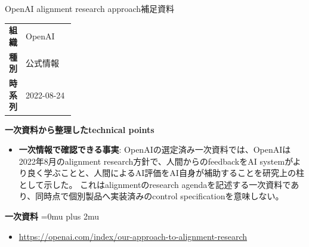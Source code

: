 \begin{technicalnote}{OpenAI alignment research approach}{補足資料}
\begingroup
\begin{tabularx}{\linewidth}{@{}>{\bfseries}p{0.22\linewidth}X@{}}
組織 & OpenAI \\
種別 & 公式情報 \\
時系列 & 2022-08-24 \\
\end{tabularx}
\smallskip
{\bfseries 一次資料から整理したtechnical points}
\begin{itemize}[leftmargin=1.5em,itemsep=0.35em]
\item \textbf{一次情報で確認できる事実}: OpenAIの選定済み一次資料では、OpenAIは2022年8月のalignment research方針で、人間からのfeedbackをAI systemがより良く学ぶことと、人間によるAI評価をAI自身が補助することを研究上の柱として示した。 これはalignmentのresearch agendaを記述する一次資料であり、同時点で個別製品へ実装済みのcontrol specificationを意味しない。
\end{itemize}
\begin{minipage}{\linewidth}
\begin{samepage}
{\bfseries 一次資料}
\begingroup\sloppy
\Urlmuskip=0mu plus 2mu\relax
\begin{itemize}[leftmargin=1.5em,itemsep=0.25em]
\item {\scriptsize\url{https://openai.com/index/our-approach-to-alignment-research}}
\end{itemize}
\endgroup
\end{samepage}
\end{minipage}
\endgroup
\end{technicalnote}
\medskip

